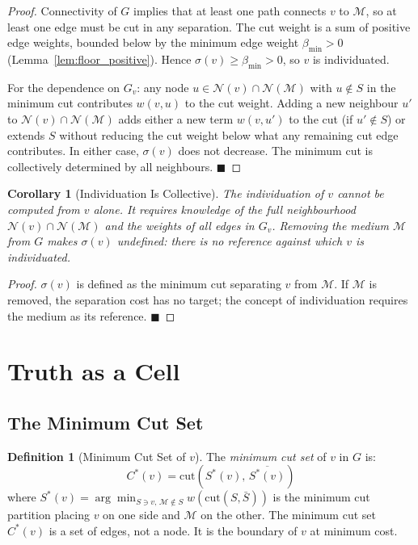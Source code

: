 \documentclass[12pt, a4paper]{article}
\theoremstyle{plain}
\newtheorem{corollary}[theorem]{Corollary}
\theoremstyle{definition}
\newtheorem{definition}[theorem]{Definition}
\theoremstyle{remark}
\newcommand{\cut}{\mathrm{cut}}
\newcommand{\med}{\mathcal{M}}
\newcommand{\Nbd}{\mathcal{N}}
\newcommand{\bmin}{\beta_{\min}}
\newcommand{\qed}{\hfill$\blacksquare$}
\begin{document}
\begin{proof}
Connectivity of $G$ implies that at least one path connects $v$ to $\med$, so
at least one edge must be cut in any separation. The cut weight is a sum of
positive edge weights, bounded below by the minimum edge weight $\bmin > 0$
(Lemma~\ref{lem:floor_positive}). Hence $\sigma(v) \geq \bmin > 0$, so $v$
is individuated.

For the dependence on $G_v$: any node $u \in \Nbd(v) \cap \Nbd(\med)$ with
$u \notin S$ in the minimum cut contributes $w(v,u)$ to the cut weight. Adding
a new neighbour $u'$ to $\Nbd(v) \cap \Nbd(\med)$ adds either a new term
$w(v,u')$ to the cut (if $u' \notin S$) or extends $S$ without reducing the
cut weight below what any remaining cut edge contributes. In either case,
$\sigma(v)$ does not decrease. The minimum cut is collectively determined by
all neighbours. \qed
\end{proof}

\begin{corollary}[Individuation Is Collective]
\label{cor:collective}
The individuation of $v$ cannot be computed from $v$ alone. It requires
knowledge of the full neighbourhood $\Nbd(v) \cap \Nbd(\med)$ and the
weights of all edges in $G_v$. Removing the medium $\med$ from $G$ makes
$\sigma(v)$ undefined: there is no reference against which $v$ is individuated.
\end{corollary}

\begin{proof}
$\sigma(v)$ is defined as the minimum cut separating $v$ from $\med$. If
$\med$ is removed, the separation cost has no target; the concept of
individuation requires the medium as its reference. \qed
\end{proof}

\section{Truth as a Cell}
\label{sec:truth}

\subsection{The Minimum Cut Set}

\begin{definition}[Minimum Cut Set of $v$]
\label{def:mincutset}
The \emph{minimum cut set} of $v$ in $G$ is:
\[
  C^*(v) = \cut(S^*(v),\, \overline{S^*(v)})
\]
where $S^*(v) = \arg\min_{S \ni v,\, \med \notin S} w(\cut(S, \bar{S}))$
is the minimum cut partition placing $v$ on one side and $\med$ on the other.
The minimum cut set $C^*(v)$ is a set of edges, not a node. It is the
boundary of $v$ at minimum cost.
\end{definition}
\end{document}
